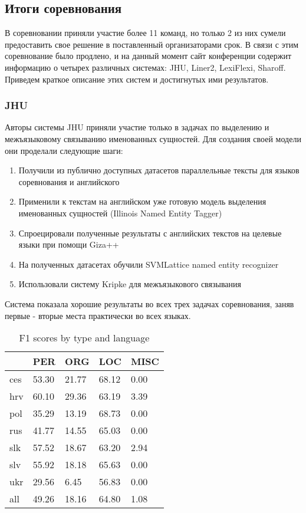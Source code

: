 \subsection{Итоги соревнования}

В соревновании приняли участие более 11 команд, но только 2 из них сумели предоставить свое решение в поставленный организаторами срок. В связи с этим соревнование было продлено, и на данный момент сайт конференции содержит информацию о четырех различных системах: JHU, Liner2, LexiFlexi, Sharoff.
Приведем краткое описание этих систем и достигнутых ими результатов.

\subsubsection{JHU}

Авторы системы JHU приняли участие только в задачах по выделению и межъязыковому связыванию именованных сущностей. Для создания своей модели они проделали следующие шаги:

\begin{enumerate}
    \item Получили из публично доступных датасетов параллельные тексты для языков соревнования и английского
    \item Применили к текстам на английском уже готовую модель выделения именованных сущностей (Illinois Named Entity Tagger)
    \item Спроецировали полученные результаты с английских текстов на целевые языки при помощи  Giza++
    \item На полученных датасетах обучили SVMLattice named entity recognizer
    \item Использовали систему Kripke для межъязыкового связывания
\end{enumerate}

Система показала хорошие результаты во всех трех задачах соревнования, заняв первые - вторые места практически во всех языках.

\begin{table}[ht]
\centering
\caption{F1 scores by type and language}
\label{JHU_trump_categories}
\begin{tabular}{|l|l|l|l|l|}
\hline
    & PER   & ORG   & LOC   & MISC \\ \hline
ces & 53.30 & 21.77 & 68.12 & 0.00 \\ \hline
hrv & 60.10 & 29.36 & 63.19 & 3.39 \\ \hline
pol & 35.29 & 13.19 & 68.73 & 0.00 \\ \hline
rus & 41.77 & 14.55 & 65.03 & 0.00 \\ \hline
slk & 57.52 & 18.67 & 63.20 & 2.94 \\ \hline
slv & 55.92 & 18.18 & 65.63 & 0.00 \\ \hline
ukr & 29.56 & 6.45  & 56.83 & 0.00 \\ \hline
all & 49.26 & 18.16 & 64.80 & 1.08 \\ \hline
\end{tabular}
\end{table}

